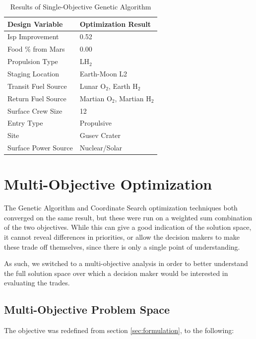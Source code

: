 \documentclass[]{aiaa-pretty}
\begin{document}
\begin{table}[h!]
	\centering
	\caption{Results of Single-Objective Genetic Algorithm}
	\label{tab:GAsingle}
	\begin{tabular}{ll}
	\textbf{Design Variable} & \textbf{Optimization Result}\\ \hline
	Isp Improvement & 0.52 \\
	Food \% from Mars & 0.00 \\
	Propulsion Type & LH$_2$ \\
	Staging Location & Earth-Moon L2 \\
	Transit Fuel Source & Lunar O$_2$, Earth H$_2$ \\
	Return Fuel Source & Martian O$_2$, Martian H$_2$ \\
	Surface Crew Size & 12\\
	Entry Type & Propulsive \\
	Site & Gusev Crater \\
	Surface Power Source & Nuclear/Solar\\
	\end{tabular}
\end{table}




\section{Multi-Objective Optimization}
\label{sec:multi}
The Genetic Algorithm and Coordinate Search optimization techniques both converged on the same result, but these were run on a weighted sum combination of the two objectives. While this can give a good indication of the solution space, it cannot reveal differences in priorities, or allow the decision makers to make these trade off themselves, since there is only a single point of understanding.

As such, we switched to a multi-objective analysis in order to better understand the full solution space over which a decision maker would be interested in evaluating the trades.

\subsection{Multi-Objective Problem Space}

The objective was redefined from section \ref{sec:formulation}, to the following:
\end{document}
